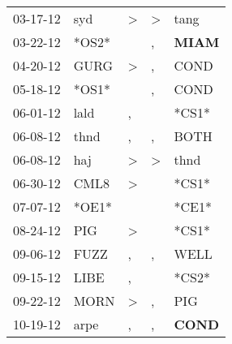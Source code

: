 \begin{supertabular}{p{0.07\textwidth}p{0.06\textwidth}p{0.02\textwidth}p{0.02\textwidth}p{0.06\textwidth}}
          03-17-12\textsuperscript{} &            syd\textsuperscript{} &     \textgreater &     \textgreater &           tang\textsuperscript{} \\
          03-22-12\textsuperscript{} &                            *OS2* &                  &                , &  \textbf{MIAM\textsuperscript{}} \\
          04-20-12\textsuperscript{} &           GURG\textsuperscript{} &     \textgreater &                , &           COND\textsuperscript{} \\
          05-18-12\textsuperscript{} &                            *OS1* &                  &                , &           COND\textsuperscript{} \\
          06-01-12\textsuperscript{} &           lald\textsuperscript{} &                , &                  &                            *CS1* \\
          06-08-12\textsuperscript{} &           thnd\textsuperscript{} &                , &                , &           BOTH\textsuperscript{} \\
          06-08-12\textsuperscript{} &            haj\textsuperscript{} &     \textgreater &     \textgreater &           thnd\textsuperscript{} \\
          06-30-12\textsuperscript{} &           CML8\textsuperscript{} &     \textgreater &                  &                            *CS1* \\
          07-07-12\textsuperscript{} &                            *OE1* &                  &                  &                            *CE1* \\
          08-24-12\textsuperscript{} &            PIG\textsuperscript{} &     \textgreater &                  &                            *CS1* \\
          09-06-12\textsuperscript{} &           FUZZ\textsuperscript{} &                , &                , &           WELL\textsuperscript{} \\
          09-15-12\textsuperscript{} &           LIBE\textsuperscript{} &                , &                  &                            *CS2* \\
          09-22-12\textsuperscript{} &           MORN\textsuperscript{} &     \textgreater &                , &            PIG\textsuperscript{} \\
          10-19-12\textsuperscript{} &           arpe\textsuperscript{} &                , &                , &  \textbf{COND\textsuperscript{}} \\

\end{supertabular}
